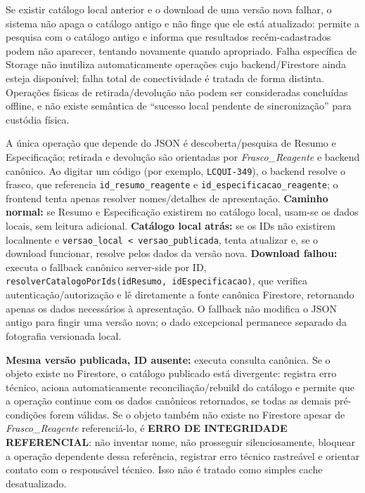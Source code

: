 \begin{regra}
Se existir catálogo local anterior e o download de uma versão nova falhar, o sistema não apaga o catálogo antigo e não finge que ele está atualizado: permite a pesquisa com o catálogo antigo e informa que resultados recém-cadastrados podem não aparecer, tentando novamente quando apropriado. Falha específica de Storage não inutiliza automaticamente operações cujo backend/Firestore ainda esteja disponível; falha total de conectividade é tratada de forma distinta. Operações físicas de retirada/devolução não podem ser consideradas concluídas offline, e não existe semântica de ``sucesso local pendente de sincronização'' para custódia física.
\end{regra}

\begin{regra}
A única operação que depende do JSON é descoberta/pesquisa de Resumo e Especificação; retirada e devolução são orientadas por \textit{Frasco\_Reagente} e backend canônico. Ao digitar um código (por exemplo, \texttt{LCQUI-349}), o backend resolve o frasco, que referencia \texttt{id\_resumo\_reagente} e \texttt{id\_especificacao\_reagente}; o frontend tenta apenas resolver nomes/detalhes de apresentação. \textbf{Caminho normal:} se Resumo e Especificação existirem no catálogo local, usam-se os dados locais, sem leitura adicional. \textbf{Catálogo local atrás:} se os IDs não existirem localmente e \texttt{versao\_local < versao\_publicada}, tenta atualizar e, se o download funcionar, resolve pelos dados da versão nova. \textbf{Download falhou:} executa o fallback canônico server-side por ID, \texttt{resolverCatalogoPorIds(idResumo, idEspecificacao)}, que verifica autenticação/autorização e lê diretamente a fonte canônica Firestore, retornando apenas os dados necessários à apresentação. O fallback não modifica o JSON antigo para fingir uma versão nova; o dado excepcional permanece separado da fotografia versionada local.

\textbf{Mesma versão publicada, ID ausente:} executa consulta canônica. Se o objeto existe no Firestore, o catálogo publicado está divergente: registra erro técnico, aciona automaticamente reconciliação/rebuild do catálogo e permite que a operação continue com os dados canônicos retornados, se todas as demais pré-condições forem válidas. Se o objeto também não existe no Firestore apesar de \textit{Frasco\_Reagente} referenciá-lo, é \textbf{ERRO DE INTEGRIDADE REFERENCIAL}: não inventar nome, não prosseguir silenciosamente, bloquear a operação dependente dessa referência, registrar erro técnico rastreável e orientar contato com o responsável técnico. Isso não é tratado como simples cache desatualizado.
\end{regra}

